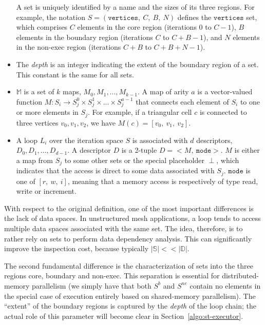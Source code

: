 \begin{itemize}
A set is uniquely identified by a name and the sizes of its three regions. For example, the notation $S = (\texttt{vertices},\ C,\ B,\ N)$ defines the $\texttt{vertices}$ set, which comprises $C$ elements in the core region (iterations $0$ to $C-1$), $B$ elements in the boundary region (iterations $C$ to $C+B-1$), and $N$ elements in the non-exec region (iterations $C+B$ to $C+B+N-1$).

\item The {\em depth} is an integer indicating the extent of the boundary region of a set. This constant is the same for all sets. 

\item $\mathbb{M}$ is a set of $k$ maps, $M_0, M_1, ..., M_{k-1}$. A map of arity $a$ is a vector-valued function $M : S_i \rightarrow S_j^0 \times S_j^1 \times ... \times S_j^{a-1}$ that connects each element of $S_i$ to one or more elements in $S_j$. For example, if a triangular cell $c$ is connected to three vertices $v_0,v_1,v_2$, we have $M(c) = [v_0,\ v_1,\ v_2]$. 

\item A loop $L_i$ over the iteration space $S$ is associated with $d$ descriptors, $D_0, D_1, ..., D_{d-1}$. A descriptor $D$ is a 2-tuple $D = {<}M,\ \texttt{mode}{>}$. $M$ is either a map from $S_j$ to some other sets or the special placeholder $\perp$, which indicates that the access is direct to some data associated with $S_j$. $\texttt{mode}$ is one of $[r,\ w,\ i]$, meaning that a memory access is respectively of type read, write or increment.
\end{itemize}

With respect to the original definition, one of the most important differences is the lack of data spaces. In unstructured mesh applications, a loop tends to access multiple data spaces associated with the same set. The idea, therefore, is to rather rely on sets to perform data dependency analysis. This can significantly improve the inspection cost, because typically $|\mathbb{S}| << |\mathbb{D}|$. 

The second fundamental difference is the characterization of sets into the three regions core, boundary and non-exec. This separation is essential for distributed-memory parallelism (we simply have that both $S^{b}$ and $S^{ne}$  contain no elements in the special case of execution entirely based on shared-memory parallelism). The ``extent'' of the boundary regions is captured by the {\em depth} of the loop chain; the actual role of this parameter will become clear in Section~\ref{algo:st-executor}. 


